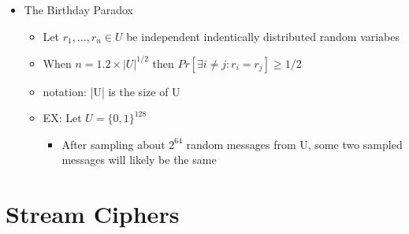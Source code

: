 \documentclass[]{article}
\begin{document}
\begin{itemize}
\begin{itemize}
\begin{itemize}
		\end{itemize}
	\end{itemize}
	\item The Birthday Paradox
	\begin{itemize}
		\item Let $r_{1}, \ldots , r_{n} \in U$ be independent indentically distributed random variabes 
		\item When $n = 1.2 \times |U|^{1/2}$ then $Pr[\exists i \neq j : r_{i} = r_{j}] \geq 1/2$
		\item notation: |U| is the size of U
		\item EX: Let $U = \{0,1\}^{128}$
		\begin{itemize}
			\item After sampling about $2^{64}$ random messages from U, some two sampled messages will likely be the same
		\end{itemize}
	\end{itemize}
\end{itemize}
\section{Stream Ciphers}
\end{document}

